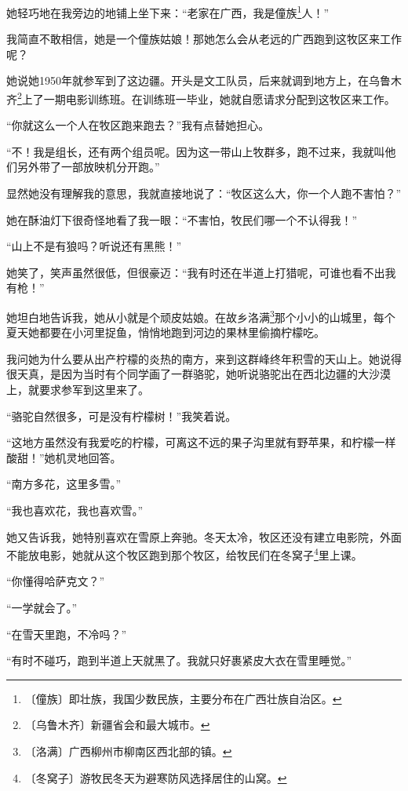 \documentclass[12pt,UTF-8,openany]{ctexbook}
\begin{document}
\begin{large}
    她轻巧地在我旁边的地铺上坐下来：“老家在广西，我是僮族\footnote{〔僮族〕即壮族，我国少数民族，主要分布在广西壮族自治区。}人！”
    
    我简直不敢相信，她是一个僮族姑娘！那她怎么会从老远的广西跑到这牧区来工作呢？
    
    她说她1950年就参军到了这边疆。开头是文工队员，后来就调到地方上，在乌鲁木齐\footnote{〔乌鲁木齐〕新疆省会和最大城市。}上了一期电影训练班。在训练班一毕业，她就自愿请求分配到这牧区来工作。
    
    “你就这么一个人在牧区跑来跑去？”我有点替她担心。
    
    “不！我是组长，还有两个组员呢。因为这一带山上牧群多，跑不过来，我就叫他们另外带了一部放映机分开跑。”
    
    显然她没有理解我的意思，我就直接地说了：“牧区这么大，你一个人跑不害怕？”
    
    她在酥油灯下很奇怪地看了我一眼：“不害怕，牧民们哪一个不认得我！”
    
    “山上不是有狼吗？听说还有黑熊！”
    
    她笑了，笑声虽然很低，但很豪迈：“我有时还在半道上打猎呢，可谁也看不出我有枪！”
    
    她坦白地告诉我，她从小就是个顽皮姑娘。在故乡洛满\footnote{〔洛满〕广西柳州市柳南区西北部的镇。}那个小小的山城里，每个夏天她都要在小河里捉鱼，悄悄地跑到河边的果林里偷摘柠檬吃。
    
    我问她为什么要从出产柠檬的炎热的南方，来到这群峰终年积雪的天山上。她说得很天真，是因为当时有个同学画了一群骆驼，她听说骆驼出在西北边疆的大沙漠上，就要求参军到这里来了。
    
    “骆驼自然很多，可是没有柠檬树！”我笑着说。
    
    “这地方虽然没有我爱吃的柠檬，可离这不远的果子沟里就有野苹果，和柠檬一样酸甜！”她机灵地回答。
    
    “南方多花，这里多雪。”
    
    “我也喜欢花，我也喜欢雪。”
    
    她又告诉我，她特别喜欢在雪原上奔驰。冬天太冷，牧区还没有建立电影院，外面不能放电影，她就从这个牧区跑到那个牧区，给牧民们在冬窝子\footnote{〔冬窝子〕游牧民冬天为避寒防风选择居住的山窝。}里上课。
    
    “你懂得哈萨克文？”
    
    “一学就会了。”
    
    “在雪天里跑，不冷吗？”
    
    “有时不碰巧，跑到半道上天就黑了。我就只好裹紧皮大衣在雪里睡觉。”
    

\end{large}
\end{document}
